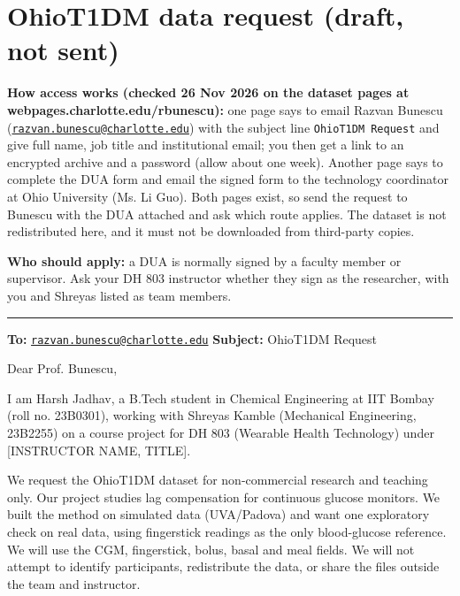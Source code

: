 \documentclass[11pt,a4paper]{article}
\begin{document}
\hypertarget{ohiot1dm-data-request-draft-not-sent}{%
\section{OhioT1DM data request (draft, not
sent)}\label{ohiot1dm-data-request-draft-not-sent}}

\textbf{How access works (checked 26 Nov 2026 on the dataset pages at
webpages.charlotte.edu/rbunescu):} one page says to email Razvan Bunescu
(\href{mailto:razvan.bunescu@charlotte.edu}{\nolinkurl{razvan.bunescu@charlotte.edu}})
with the subject line \texttt{OhioT1DM\ Request} and give full name, job
title and institutional email; you then get a link to an encrypted
archive and a password (allow about one week). Another page says to
complete the DUA form and email the signed form to the technology
coordinator at Ohio University (Ms. Li Guo). Both pages exist, so send
the request to Bunescu with the DUA attached and ask which route
applies. The dataset is not redistributed here, and it must not be
downloaded from third-party copies.

\textbf{Who should apply:} a DUA is normally signed by a faculty member
or supervisor. Ask your DH 803 instructor whether they sign as the
researcher, with you and Shreyas listed as team members.

\begin{center}\rule{0.5\linewidth}{0.5pt}\end{center}

\textbf{To:}
\href{mailto:razvan.bunescu@charlotte.edu}{\nolinkurl{razvan.bunescu@charlotte.edu}}
\textbf{Subject:} OhioT1DM Request

Dear Prof. Bunescu,

I am Harsh Jadhav, a B.Tech student in Chemical Engineering at IIT
Bombay (roll no. 23B0301), working with Shreyas Kamble (Mechanical
Engineering, 23B2255) on a course project for DH 803 (Wearable Health
Technology) under {[}INSTRUCTOR NAME, TITLE{]}.

We request the OhioT1DM dataset for non-commercial research and teaching
only. Our project studies lag compensation for continuous glucose
monitors. We built the method on simulated data (UVA/Padova) and want
one exploratory check on real data, using fingerstick readings as the
only blood-glucose reference. We will use the CGM, fingerstick, bolus,
basal and meal fields. We will not attempt to identify participants,
redistribute the data, or share the files outside the team and
instructor.
\end{document}
